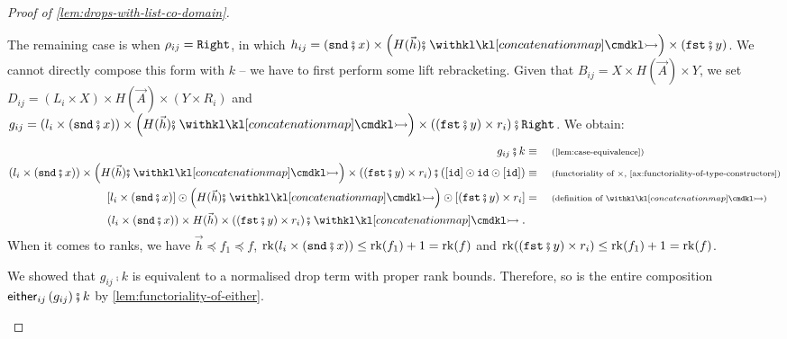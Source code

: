 \begin{proof}[Proof of \cref{lem:drops-with-list-co-domain}]
\begin{description}
\begin{description}
			The remaining case is when $\rho_{ij} = \mathtt{Right}$, in which $h_{i j} = (\sndterm \comp x) \times \left( H(\vec h) \comp \concmap \right) \times (\fstterm \comp y)$. We cannot directly compose this form with $k$ -- we have to first perform some lift rebracketing. Given that $B_{i j} = X \times H(\vec A) \times Y$, we set $D_{i j} = (L_i \times X) \times H(\vec A) \times (Y \times R_i)$ and $g_{ij} = \left( l_i \times (\sndterm \comp x) \right) \times \left( H(\vec h) \comp \concmap \right) \times \left( (\fstterm \comp y) \times r_i \right) \comp \rightterm$. We obtain:
			\begin{align*}
				g_{i j} \comp k \equalbecause{\cref{lem:case-equivalence}} \\
				\left( l_i \times (\sndterm \comp x) \right) \times \left( H(\vec h) \comp \concmap \right) \times \left( (\fstterm \comp y) \times r_i \right) \comp \left( [\idterm] \odot \idterm \odot [\idterm] \right) \equalbecause{functoriality of $\times$, \cref{ax:functoriality-of-type-constructors}} \\ 
				\left[ l_i \times (\sndterm \comp x) \right] \odot \left( H(\vec h) \comp \concmap \right) \odot \left[ (\fstterm \comp y) \times r_i \right] &= \why{definition of $\concmap$} \\ 
				\left( l_i \times (\sndterm \comp x) \right) \times H(\vec h) \times \left( (\fstterm \comp y) \times r_i \right) \comp \concmap. 
			\end{align*}
			When it comes to ranks, we have $\vec h \preceq f_1 \preceq f$, $\rk(l_i \times (\sndterm \comp x)) \leq \rk(f_1) + 1 = \rk(f)$ and $\rk((\fstterm \comp y) \times r_i) \leq \rk(f_1) + 1 = \rk(f)$.

			We showed that $g_{i j} \comp k$ is equivalent to a normalised drop term with proper rank bounds. Therefore, so is the entire composition $\eithermany{i j}{(g_{i j})} \comp k$ by \cref{lem:functoriality-of-either}.
		\end{description}
	\end{description}
\end{proof}
